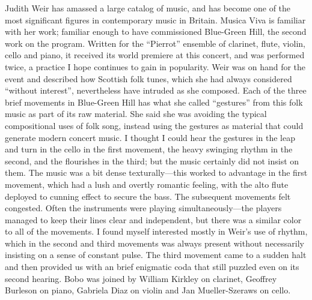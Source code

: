 Judith Weir has amassed a large catalog of music, and has become one of the most significant figures in contemporary music in Britain. Musica Viva is familiar with her work; familiar enough to have commissioned Blue-Green Hill, the second work on the program. Written for the “Pierrot” ensemble of clarinet, flute, violin, cello and piano, it received its world premiere at this concert, and was performed twice, a practice I hope continues to gain in popularity. Weir was on hand for the event and described how Scottish folk tunes, which she had always considered “without interest”, nevertheless have intruded as she composed. Each of the three brief movements in Blue-Green Hill has what she called “gestures” from this folk music as part of its raw material. She said she was avoiding the typical compositional uses of folk song, instead using the gestures as material that could generate modern concert music. I thought I could hear the gestures in the leap and turn in the cello in the first movement, the heavy swinging rhythm in the second, and the flourishes in the third; but the music certainly did not insist on them. The music was a bit dense texturally—this worked to advantage in the first movement, which had a lush and overtly romantic feeling, with the alto flute deployed to cunning effect to secure the bass. The subsequent movements felt congested. Often the instruments were playing simultaneously—the players managed to keep their lines clear and independent, but there was a similar color to all of the movements. I found myself interested mostly in Weir’s use of rhythm, which in the second and third movements was always present without necessarily insisting on a sense of constant pulse. The third movement came to a sudden halt and then provided us with an brief enigmatic coda that still puzzled even on its second hearing. Bobo was joined by William Kirkley on clarinet, Geoffrey Burleson on piano, Gabriela Diaz on violin and Jan Mueller-Szeraws on cello.

